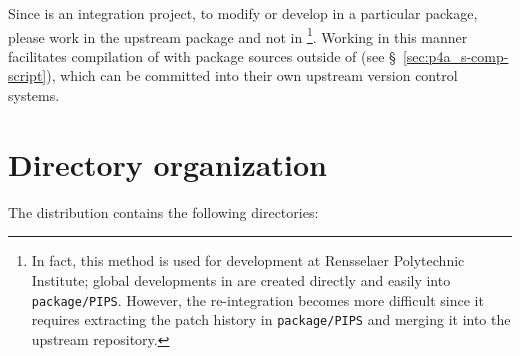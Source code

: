 \documentclass[a4paper]{article}
\begin{document}
Since \Apfa is an integration project, to modify or develop in
a particular package, please work in the upstream package and not in
\Apfa\footnote{In fact, this method is used for \Apfa development at Rensselaer
  Polytechnic Institute; global developments in \Apips are created
  directly and easily into \texttt{package/PIPS}. However,
  the re-integration becomes more difficult since it requires extracting the
  patch history in \texttt{package/PIPS} and merging it into the \Apips
  upstream \Asvn repository.}. Working in this manner facilitates
compilation of \Apfa with package sources outside of \Apfa (see
\S~\ref{sec:p4a_s-comp-script}), which can be committed into their own upstream
version control systems.


\section{Directory organization}
\label{sec:direct-organ}
The \Apfa distribution contains the following directories:
\end{document}
